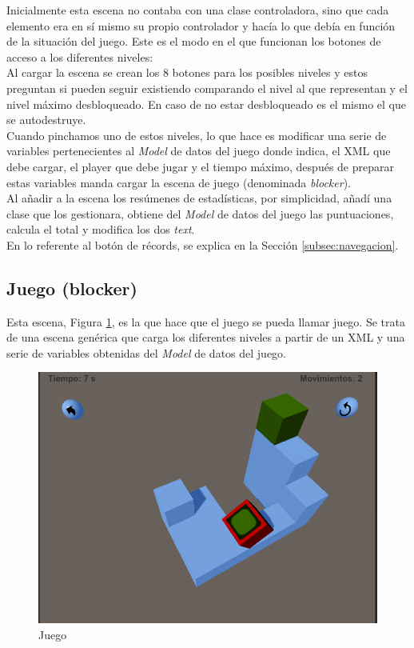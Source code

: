 \documentclass{article}
\begin{document}
Inicialmente esta escena no contaba con una clase controladora, sino que cada elemento era en sí mismo su propio controlador y hacía lo que debía en función de la situación del juego. Este es el modo en el que funcionan los botones de acceso a los diferentes niveles:\\

Al cargar la escena se crean los 8 botones para los posibles niveles y estos preguntan si pueden seguir existiendo comparando el nivel al que representan y el nivel máximo desbloqueado. En caso de no estar desbloqueado es el mismo el que se autodestruye. \\

Cuando pinchamos uno de estos niveles, lo que hace es modificar una serie de variables pertenecientes al \emph{Model} de datos del juego donde indica, el XML que debe cargar, el player que debe jugar y el tiempo máximo, después de preparar estas variables manda cargar la escena de juego (denominada \emph{blocker}). \\

Al añadir a la escena los resúmenes de estadísticas, por simplicidad, añadí una clase que los gestionara, obtiene del \emph{Model} de datos del juego las puntuaciones, calcula el total y modifica los dos \emph{text}.\\

En lo referente al botón de récords, se explica en la Sección \ref{subsec:navegacion}.
\newpage
\subsection{Juego (blocker)}
Esta escena, Figura \ref{fig:juego}, es la que hace que el juego se pueda llamar juego. Se trata de una escena genérica que carga los diferentes niveles a partir de un XML y una serie de variables obtenidas del \emph{Model} de datos del juego.

\begin{figure}[h!]
\centering
\includegraphics[scale=.4]{juego.png}
\caption{Juego}
\label{fig:juego}
\end{figure}
\end{document}
